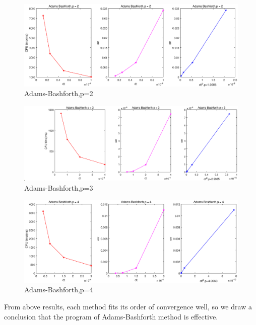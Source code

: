 \documentclass[a4paper,twocolumn]{article}
\theoremstyle{definition}
\begin{document}
\begin{figure}[!htp]   
	\centering
	\includegraphics[width=12cm]{Pictures/2_1_2.eps}
	\caption{Adams-Bashforth,p=2}
	\label{fig:AB2gf}
\end{figure}
\begin{figure}[!htp]   
	\centering
	\includegraphics[width=12cm]{Pictures/2_1_3.eps}
	\caption{Adams-Bashforth,p=3}
	\label{fig:AB3gf}
\end{figure}
\begin{figure}[!htp]   
	\centering
	\includegraphics[width=12cm]{Pictures/2_1_4.eps}
	\caption{Adams-Bashforth,p=4}
	\label{fig:AB4gf}
\end{figure}
\twocolumn 
\noindent From above results, each method fits its order of convergence well, so we draw a conclusion that the program of Adams-Bashforth method is effective. 
\end{document}
